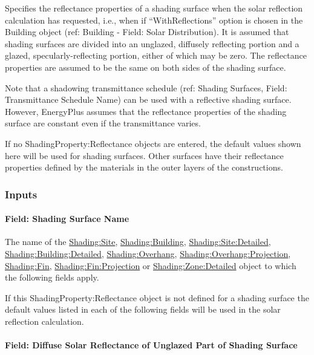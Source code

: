 Specifies the reflectance properties of a shading surface when the solar reflection calculation has requested, i.e., when if ``WithReflections'' option is chosen in the Building object (ref: Building - Field: Solar Distribution). It is assumed that shading surfaces are divided into an unglazed, diffusely reflecting portion and a glazed, specularly-reflecting portion, either of which may be zero. The reflectance properties are assumed to be the same on both sides of the shading surface.

Note that a shadowing transmittance schedule (ref: Shading Surfaces, Field: Transmittance Schedule Name) can be used with a reflective shading surface. However, EnergyPlus assumes that the reflectance properties of the shading surface are constant even if the transmittance varies.

If no ShadingProperty:Reflectance objects are entered, the default values shown here will be used for shading surfaces. Other surfaces have their reflectance properties defined by the materials in the outer layers of the constructions.

\subsubsection{Inputs}\label{inputs-31-002}

\paragraph{Field: Shading Surface Name}\label{field-shading-surface-name}

The name of the \hyperref[shadingsite-shadingbuilding]{Shading:Site}, \hyperref[shadingsite-shadingbuilding]{Shading:Building}, \hyperref[shadingsitedetailed-shadingbuildingdetailed]{Shading:Site:Detailed}, \hyperref[shadingsitedetailed-shadingbuildingdetailed]{Shading:Building:Detailed}, \hyperref[shadingoverhang]{Shading:Overhang}, \hyperref[shadingoverhangprojection]{Shading:Overhang:Projection}, \hyperref[shadingfin]{Shading:Fin}, \hyperref[shadingfinprojection]{Shading:Fin:Projection} or \hyperref[shadingzonedetailed-000]{Shading:Zone:Detailed} object to which the following fields apply.

If this ShadingProperty:Reflectance object is not defined for a shading surface the default values listed in each of the following fields will be used in the solar reflection calculation.

\paragraph{Field: Diffuse Solar Reflectance of Unglazed Part of Shading Surface}\label{field-diffuse-solar-reflectance-of-unglazed-part-of-shading-surface}


